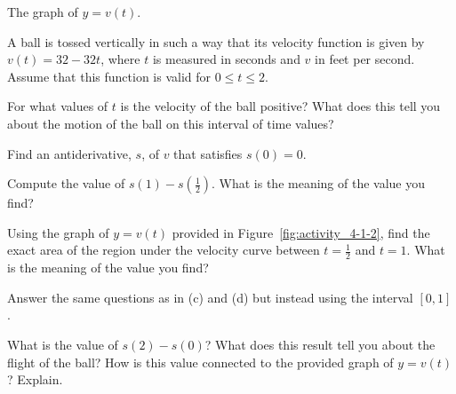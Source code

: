 \begin{marginfigure}
\caption{The graph of $y = v(t)$.} \label{fig:activity_4-1-2}
\end{marginfigure}

\begin{activity} \label{A:4.1.2}  A ball is tossed vertically in such a way that its velocity function is given by $v(t) = 32 - 32t$, where $t$ is measured in seconds and $v$ in feet per second.  Assume that this function is valid for $0 \le t \le 2$.
\ba
\item For what values of $t$ is the velocity of the ball positive?  What does this tell you about the motion of the ball on this interval of time values?

\item Find an antiderivative, $s$, of $v$ that satisfies $s(0) = 0$.  

\item Compute the value of $s(1) - s(\frac{1}{2})$.  What is the meaning of the value you find?

\item Using the graph of $y = v(t)$ provided in Figure~\ref{fig:activity_4-1-2}, find the exact area of the region under the velocity curve between $t = \frac{1}{2}$ and $t = 1$.  What is the meaning of the value you find?

\item Answer the same questions as in (c) and (d) but instead using the interval $[0,1]$.

\item What is the value of $s(2) - s(0)$?  What does this result tell you about the flight of the ball?  How is this value connected to the provided graph of $y = v(t)$?  Explain.
\ea
\end{activity}

